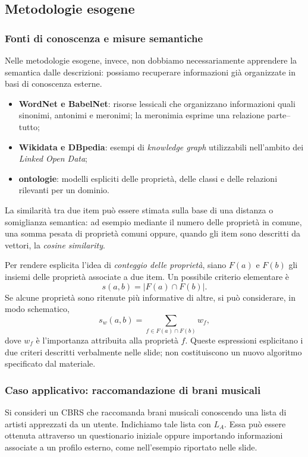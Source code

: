 \subsection{Metodologie esogene}

\subsubsection{Fonti di conoscenza e misure semantiche}
Nelle metodologie esogene, invece, non dobbiamo necessariamente apprendere la semantica dalle descrizioni: possiamo recuperare informazioni già organizzate in basi di conoscenza esterne.
\begin{itemize}
    \item \textbf{WordNet e BabelNet}: risorse lessicali che organizzano informazioni quali sinonimi, antonimi e meronimi; la meronimia esprime una relazione parte--tutto;
    \item \textbf{Wikidata e DBpedia}: esempi di \emph{knowledge graph} utilizzabili nell'ambito dei \emph{Linked Open Data};
    \item \textbf{ontologie}: modelli espliciti delle proprietà, delle classi e delle relazioni rilevanti per un dominio.
\end{itemize}
La similarità tra due item può essere stimata sulla base di una distanza o somiglianza semantica: ad esempio mediante il numero delle proprietà in comune, una somma pesata di proprietà comuni oppure, quando gli item sono descritti da vettori, la \emph{cosine similarity}.

Per rendere esplicita l'idea di \emph{conteggio delle proprietà}, siano $F(a)$ e $F(b)$ gli insiemi delle proprietà associate a due item. Un possibile criterio elementare è
\[
 s(a,b)=|F(a)\cap F(b)|.
\]
Se alcune proprietà sono ritenute più informative di altre, si può considerare, in modo schematico,
\[
 s_w(a,b)=\sum_{f\in F(a)\cap F(b)}w_f,
\]
dove $w_f$ è l'importanza attribuita alla proprietà $f$. Queste espressioni esplicitano i due criteri descritti verbalmente nelle slide; non costituiscono un nuovo algoritmo specificato dal materiale.

\subsubsection{Caso applicativo: raccomandazione di brani musicali}
Si consideri un CBRS che raccomanda brani musicali conoscendo una lista di artisti apprezzati da un utente. Indichiamo tale lista con $L_A$. Essa può essere ottenuta attraverso un questionario iniziale oppure importando informazioni associate a un profilo esterno, come nell'esempio riportato nelle slide.

